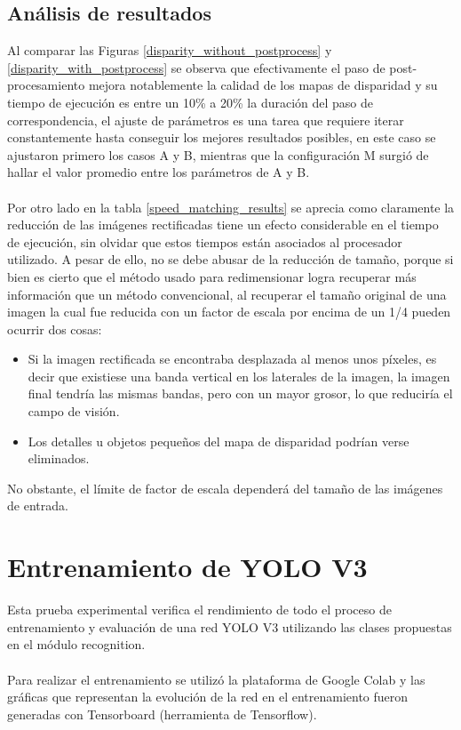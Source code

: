 \subsection{Análisis de resultados}
Al comparar las Figuras \ref{disparity_without_postprocess} y \ref{disparity_with_postprocess} se observa que efectivamente el paso de post-procesamiento mejora notablemente la calidad de los mapas de disparidad y su tiempo de ejecución es entre un 10\% a 20\% la duración del paso de correspondencia, el ajuste de parámetros es una tarea que requiere iterar constantemente hasta conseguir los mejores resultados posibles, en este caso se ajustaron primero los casos A y B, mientras que la configuración M surgió de hallar el valor promedio entre los parámetros de A y B. 
\\
\\
Por otro lado en la tabla \ref{speed_matching_results} se aprecia como claramente la reducción de las imágenes rectificadas tiene un efecto considerable en el tiempo de ejecución, sin olvidar que estos tiempos están asociados al procesador utilizado. A pesar de ello, no se debe abusar de la reducción de tamaño, porque si bien es cierto que el método usado para redimensionar logra recuperar más información que un método convencional, al recuperar el tamaño original de una imagen la cual fue reducida con un factor de escala por encima de un 1/4 pueden ocurrir dos cosas:
\begin{itemize}
    \item Si la imagen rectificada se encontraba desplazada al menos unos píxeles, es decir que existiese una banda vertical en los laterales de la imagen, la imagen final tendría las mismas bandas, pero con un mayor grosor, lo que reduciría el campo de visión.
    \item Los detalles u objetos pequeños del mapa de disparidad podrían verse eliminados.
\end{itemize}
No obstante, el límite de factor de escala dependerá del tamaño de las imágenes de entrada.
\section{Entrenamiento de YOLO V3}
Esta prueba experimental verifica el rendimiento de todo el proceso de entrenamiento y evaluación de una red YOLO V3 utilizando las clases propuestas en el módulo recognition.
\\
\\
Para realizar el entrenamiento se utilizó la plataforma de Google Colab y las gráficas que representan la evolución de la red en el entrenamiento fueron generadas con Tensorboard (herramienta de Tensorflow).

